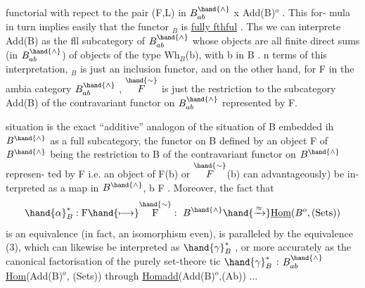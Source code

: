 
functorial with repect to the pair (F,L) in  $B^{\hand{\wedge}}_{ab}$ x Add(B)$^{o}$ .  This for-%
mula in turn implies easily that the functor \hand{$\gamma$}$_{B}$ is \uline{fully fthful} .
Ths we can interprete Add(B) as the fll subcategory of $B^{\hand{\wedge}}_{ab}$  
whose objects are all finite direct sums (in $B^{\hand{\wedge}}_{ab}$) of objects of the
type Wh$_{B}$(b),  with b in B .  n terms of this interpretation, \hand{$\gamma$}$_{B}$  is
just an inclusion functor,  and on the other hand,  for F in the ambia
category $B^{\hand{\wedge}}_{ab}$ ,  $\overset{\hand{\sim}}{F}$  is just the restriction to the subcategory Add(B)
of the contravariant functor on $B^{\hand{\wedge}}_{ab}$  represented by F. 

 situation
is the exact ``additive'' analogon of the situation of B embedded ih $B^{\hand{\wedge}}$
as a full subcategory,  the functor on B defined by an object F of $B^{\hand{\wedge}}$
being the restriction to B of the contravariant functor on $B^{\hand{\wedge}}$ represen-%
ted by F\hand{,} i.e. an object of F(b) or $\overset{\hand{\sim}}{F}$(b) can  advantageously) be in-%
terpreted as a map in $B^{\hand{\wedge}}$,  b \hand{$\longrightarrow$} F .  Moreover,  the fact that  
\[ \hand{\alpha}^{*}_{B} : \text{F} \hand{\longmapsto} \overset{\hand{\sim}}{\text{F}} :\ B^{\hand{\wedge}} \hand{\xrightarrow{\approx}} \underline{\text{Hom}}(B^{o},(\text{Sets})) \]
is an equivalence (in fact,  an isomorphism even),  is paralleled by
the equivalence (3),  which can likewise be interpreted as $\hand{\gamma}^{*}_{B}$ ,  or
more accurately as the canonical factorisation of the purely set-theore%
tic $\hand{\gamma}^{*}_{B}$ : $B^{\hand{\wedge}}_{ab}$ \hand{$\longrightarrow$} \uline{Hom}(Add(B)$^{o}$, (Sets)) through \uline{Homadd}(Add(B)$^{o}$,(Ab)) ...

